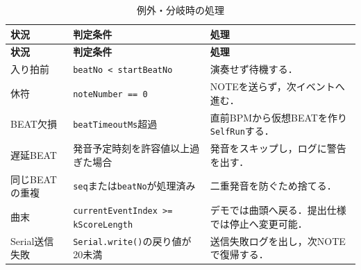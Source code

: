 \documentclass[lualatex,book,paper=a4paper,jafontsize=11.5pt,jafontscale=1.05]{jlreq}
\newcommand{\code}[1]{\texttt{#1}}
\begin{document}
\begin{longtable}{p{}p{}p{}}
\caption{例外・分岐時の処理}\label{tab:saito-exceptions}\\
\toprule
\textbf{状況} & \textbf{判定条件} & \textbf{処理} \\
\midrule
\endfirsthead
\toprule
\textbf{状況} & \textbf{判定条件} & \textbf{処理} \\
\midrule
\endhead
入り拍前 & \code{beatNo < startBeatNo} & 演奏せず待機する．\\
休符 & \code{noteNumber == 0} & NOTEを送らず，次イベントへ進む．\\
BEAT欠損 & \code{beatTimeoutMs}超過 & 直前BPMから仮想BEATを作り\code{SelfRun}する．\\
遅延BEAT & 発音予定時刻を許容値以上過ぎた場合 & 発音をスキップし，ログに警告を出す．\\
同じBEATの重複 & \code{seq}または\code{beatNo}が処理済み & 二重発音を防ぐため捨てる．\\
曲末 & \code{currentEventIndex >= kScoreLength} & デモでは曲頭へ戻る．提出仕様では停止へ変更可能．\\
Serial送信失敗 & \code{Serial.write()}の戻り値が20未満 & 送信失敗ログを出し，次NOTEで復帰する．\\
\bottomrule
\end{longtable}
\end{document}
